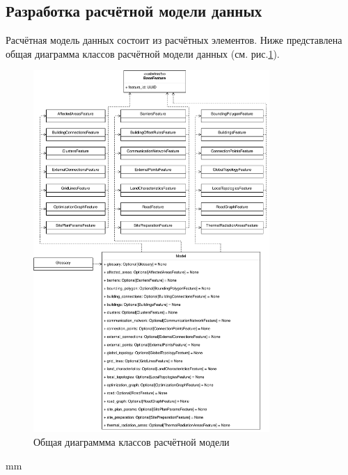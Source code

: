\subsection{\large{Разработка расчётной модели данных}}

Расчётная модель данных состоит из расчётных элементов. Ниже представлена общая диаграмма классов расчётной модели данных
(см. рис.\ref{pic:implementation__model-classes}).

\begin{figure}[H]
	\includegraphics[width=0.8\textwidth]{implementation/pictures/model/classes}
	\caption{Общая диаграммма классов расчётной модели}
	\label{pic:implementation__model-classes}
\end{figure}
 mm

